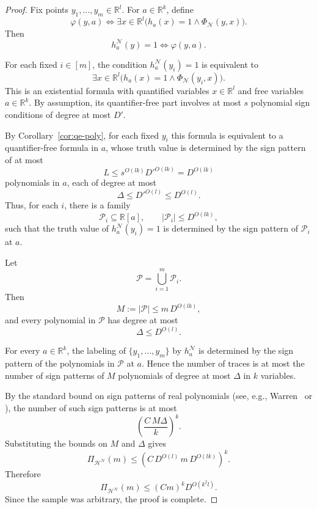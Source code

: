 \documentclass[11pt]{article}
\theoremstyle{plain}
\theoremstyle{definition}
\theoremstyle{remark}
\newcommand{\R}{\mathbb{R}}
\begin{document}
\begin{proof}
Fix points $y_1,\dots,y_m\in\R^l$. For $a\in\R^k$, define
\[
\varphi(y,a)
\iff
\exists x\in\R^l
\bigl(h_a(x)=1 \wedge \Phi_{\mathcal N}(y,x)\bigr).
\]
Then
\[
h_a^{\mathcal N}(y)=1
\iff
\varphi(y,a).
\]

For each fixed $i\in[m]$, the condition $h_a^{\mathcal N}(y_i)=1$ is
equivalent to
\[
\exists x\in\R^l
\bigl(h_a(x)=1 \wedge \Phi_{\mathcal N}(y_i,x)\bigr).
\]
This is an existential formula with quantified variables $x\in\R^l$ and
free variables $a\in\R^k$. By assumption, its quantifier-free part involves
at most $s$ polynomial sign conditions of degree at most $D'$.

By Corollary~\ref{cor:qe-poly}, for each fixed $y_i$ this formula
is equivalent to a quantifier-free formula in $a$, whose truth value is
determined by the sign pattern of at most
\[
L\le s^{O(lk)}D'^{O(lk)} = D^{O(lk)}
\]
polynomials in $a$, each of degree at most
\[
\Delta\le D'^{O(l)} \leq D^{O(l)}.
\]
Thus, for each $i$, there is a family
\[
\mathcal P_i\subseteq \R[a],
\qquad
|\mathcal P_i|\le D^{O(lk)},
\]
such that the truth value of $h_a^{\mathcal N}(y_i)=1$ is determined by
the sign pattern of $\mathcal P_i$ at $a$.

Let
\[
\mathcal P=\bigcup_{i=1}^m \mathcal P_i.
\]
Then
\[
M:=|\mathcal P|
\le
m\,D^{O(lk)},
\]
and every polynomial in $\mathcal P$ has degree at most
\[
\Delta\le D^{O(l)}.
\]

For every $a\in\R^k$, the labeling of
$\{y_1,\dots,y_m\}$ by $h_a^{\mathcal N}$ is determined by the sign pattern
of the polynomials in $\mathcal P$ at $a$. Hence the number of traces is at
most the number of sign patterns of $M$ polynomials of degree at most
$\Delta$ in $k$ variables.

By the standard bound on sign patterns of real polynomials
(see, e.g., Warren~\cite{warren1968} or
\cite[Proposition~5.5]{alon1995tools}), the number of such sign patterns is at most
\[
\left(\frac{C\, M \Delta}{k}\right)^k.
\]
Substituting the bounds on $M$ and $\Delta$ gives
\[
\Pi_{\mathcal H^{\mathcal N}}(m)
\le
\left(C\,D^{O(l)}\,m\,D^{O(lk)}\right)^k.
\]
Therefore
\[
\Pi_{\mathcal H^{\mathcal N}}(m)
\le
(Cm)^k D^{O(k^2l)}.
\]
Since the sample was arbitrary, the proof is complete.
\end{proof}
\end{document}

